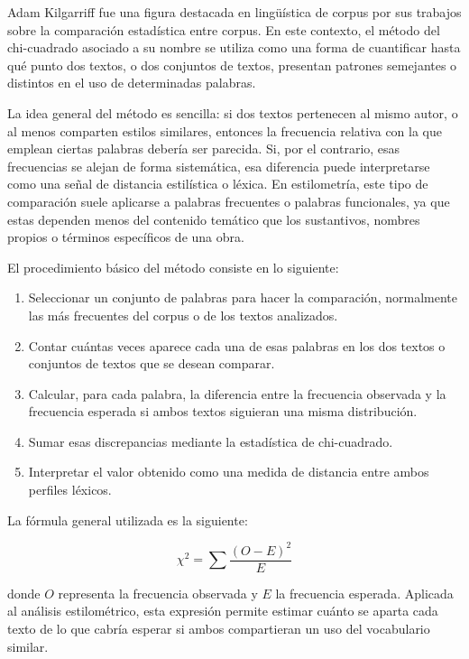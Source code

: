\documentclass[IB]{TFUOC}%
\begin{document}
Adam Kilgarriff fue una figura destacada en lingüística de corpus por sus trabajos sobre la comparación estadística entre corpus. En este contexto, el método del chi-cuadrado asociado a su nombre se utiliza como una forma de cuantificar hasta qué punto dos textos, o dos conjuntos de textos, presentan patrones semejantes o distintos en el uso de determinadas palabras\cite{kilgarriff2001comparing}.

La idea general del método es sencilla: si dos textos pertenecen al mismo autor, o al menos comparten estilos similares, entonces la frecuencia relativa con la que emplean ciertas palabras debería ser parecida. Si, por el contrario, esas frecuencias se alejan de forma sistemática, esa diferencia puede interpretarse como una señal de distancia estilística o léxica. En estilometría, este tipo de comparación suele aplicarse a palabras frecuentes o palabras funcionales, ya que estas dependen menos del contenido temático que los sustantivos, nombres propios o términos específicos de una obra.

El procedimiento básico del método consiste en lo siguiente:

\begin{enumerate}
    \item Seleccionar un conjunto de palabras para hacer la comparación, normalmente las más frecuentes del corpus o de los textos analizados.
    \item Contar cuántas veces aparece cada una de esas palabras en los dos textos o conjuntos de textos que se desean comparar.
    \item Calcular, para cada palabra, la diferencia entre la frecuencia observada y la frecuencia esperada si ambos textos siguieran una misma distribución.
    \item Sumar esas discrepancias mediante la estadística de chi-cuadrado.
    \item Interpretar el valor obtenido como una medida de distancia entre ambos perfiles léxicos.
\end{enumerate}

La fórmula general utilizada es la siguiente:

\begin{equation}
    \chi^2 = \sum \frac{(O - E)^2}{E}
\end{equation}

donde $O$ representa la frecuencia observada y $E$ la frecuencia esperada. Aplicada al análisis estilométrico, esta expresión permite estimar cuánto se aparta cada texto de lo que cabría esperar si ambos compartieran un uso del vocabulario similar.
\end{document}
